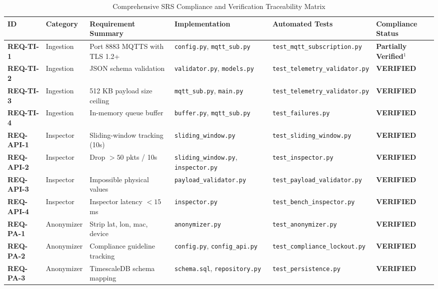 \begin{table}[H]
\centering
\caption{Comprehensive SRS Compliance and Verification Traceability Matrix}
\label{tab:traceability_matrix}
\scriptsize
\begin{tabularx}{\linewidth}{@{}l p{1.6cm} p{2.4cm} p{2.2cm} p{2.2cm} p{2.5cm}@{}}
\toprule
\textbf{ID} & \textbf{Category} & \textbf{Requirement Summary} & \textbf{Implementation} & \textbf{Automated Tests} & \textbf{Compliance Status} \\
\midrule
\textbf{REQ-TI-1} & Ingestion & Port 8883 MQTTS with TLS 1.2+ & \texttt{config.py}, \texttt{mqtt\_sub.py} & \texttt{test\_mqtt\_subscription.py} & \textbf{Partially Verified}$^1$ \\
\textbf{REQ-TI-2} & Ingestion & JSON schema validation & \texttt{validator.py}, \texttt{models.py} & \texttt{test\_telemetry\_validator.py} & \textbf{VERIFIED} \\
\textbf{REQ-TI-3} & Ingestion & 512 KB payload size ceiling & \texttt{mqtt\_sub.py}, \texttt{main.py} & \texttt{test\_telemetry\_validator.py} & \textbf{VERIFIED} \\
\textbf{REQ-TI-4} & Ingestion & In-memory queue buffer & \texttt{buffer.py}, \texttt{mqtt\_sub.py} & \texttt{test\_failures.py} & \textbf{VERIFIED} \\
\textbf{REQ-API-1} & Inspector & Sliding-window tracking (10s) & \texttt{sliding\_window.py} & \texttt{test\_sliding\_window.py} & \textbf{VERIFIED} \\
\textbf{REQ-API-2} & Inspector & Drop $> 50$ pkts / 10s & \texttt{sliding\_window.py}, \texttt{inspector.py} & \texttt{test\_inspector.py} & \textbf{VERIFIED} \\
\textbf{REQ-API-3} & Inspector & Impossible physical values & \texttt{payload\_validator.py} & \texttt{test\_payload\_validator.py} & \textbf{VERIFIED} \\
\textbf{REQ-API-4} & Inspector & Inspector latency $< 15$ ms & \texttt{inspector.py} & \texttt{test\_bench\_inspector.py} & \textbf{VERIFIED} \\
\textbf{REQ-PA-1} & Anonymizer & Strip lat, lon, mac, device & \texttt{anonymizer.py} & \texttt{test\_anonymizer.py} & \textbf{VERIFIED} \\
\textbf{REQ-PA-2} & Anonymizer & Compliance guideline tracking & \texttt{config.py}, \texttt{config\_api.py} & \texttt{test\_compliance\_lockout.py} & \textbf{VERIFIED} \\
\textbf{REQ-PA-3} & Anonymizer & TimescaleDB schema mapping & \texttt{schema.sql}, \texttt{repository.py} & \texttt{test\_persistence.py} & \textbf{VERIFIED} \\

\end{tabularx}
\end{table}
